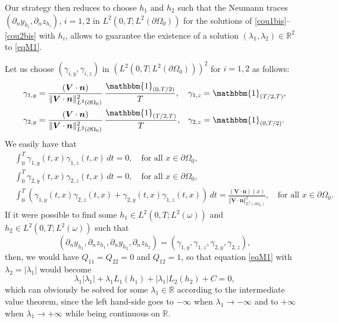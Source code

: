 \documentclass[JEP,XML,SOM,Unicode,NoFloatCountersInSection]{cedram}
\newcommand{\bn}{\boldsymbol{n}}
\newcommand{\bV}{\boldsymbol{V}}
\newcommand\R{{\mathbb R}}
\newcommand{\norm}[1]{\Vert#1\Vert}
\theoremstyle{definition}
\begin{document}
Our strategy then reduces to choose $h_1$ and $h_2$ such that the Neumann traces $(\partial_n y_{h_i},\partial_n z_{h_i})$, $i=1,2$ in $L^2(0,T; L^2(\partial\Omega_0))$ for the solutions of \eqref{cou1bis}--\eqref{cou2bis} with $h_i$, allows to guarantee the existence of a solution $(\lambda_1, \lambda_2) \in \R^2$ to \eqref{eqM1}.

Let us choose $(\gamma_{i,y}, \gamma_{i,z})$ in $(L^2(0,T; L^2(\partial \Omega_0)))^2$ for $i = 1, 2$ as follows:
\begin{align*}
\gamma_{1,y} &= \frac{(\bV \cdot \bn)}{\norm{\bV\cdot \bn}_{L^2(\partial\Omega_0)}^2}\, \frac{\mathbbm{1}_{(0,T/2)} }{T},
&\gamma_{1,z} &= \mathbbm{1}_{(T/2,T)},
\\
\gamma_{2, y} &= \frac{(\bV \cdot \bn)}{\norm{\bV\cdot \bn}_{L^2(\partial\Omega_0)}^2}\, \frac{\mathbbm{1}_{(T/2,T)} }{T},
&\gamma_{2, z} &= \mathbbm{1}_{(0,T/2)}.
\end{align*}
We easily have that
\begin{align*}
& \int_0^T \gamma_{1, y} (t, x) \gamma_{1,z}(t,x) \, dt = 0, \quad\text{for all } x \in \partial \Omega_0,
\\
& \int_0^T \gamma_{2, y} (t, x) \gamma_{2,z}(t,x) \, dt = 0, \quad\text{for all } x \in \partial \Omega_0,
\\
&
\int_0^T(\gamma_{1,y} (t,x) \gamma_{2,z} (t,x)+ \gamma_{2,y} (t,x)\gamma_{1,z} (t,x))\, dt = \frac{(\bV \cdot \bn)(x)}{\norm{\bV\cdot \bn}_{L^2(\partial\Omega_0)}^2},\quad\text{for all } x \in \partial \Omega_0.
\end{align*}
If it were possible to find some $h_1\in L^2(0,T; L^2(\omega))$ and $h_2\in L^2(0,T; L^2(\omega))$ such that
\begin{equation}
\label{exh}
(\partial_{n} y_{h_1},\partial_{n} z_{h_1},\partial_{n} y_{h_2},\partial_{n}z_{h_2})
=(\gamma_{1,y},\gamma_{1,z},\gamma_{2,y},\gamma_{2,z}),
\end{equation}
then, we would have $Q_{11}=Q_{22}=0$ and $Q_{12}=1$, so that equation \eqref{eqM1} with $\lambda_2 = |\lambda_1|$ would become
\begin{equation*}
\lambda_1|\lambda_1|+\lambda_1 L_1(h_1)+|\lambda_1| L_2(h_2)+C=0,
\end{equation*}
which can obviously be solved for some $\lambda_1 \in \R$ according to the intermediate value theorem, since the left hand-side goes to $-\infty$ when $\lambda_1 \to -\infty$ and to $+\infty$ when $\lambda_1 \to +\infty$ while being continuous on $\R$.
\end{document}
